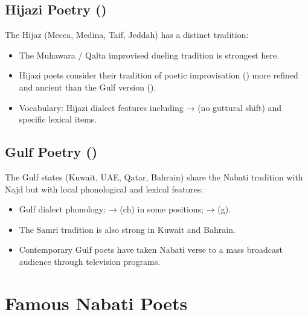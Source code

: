 \subsection{Hijazi Poetry ()}

The Hijaz (Mecca, Medina, Taif, Jeddah) has a distinct tradition:
\begin{itemize}
  \item The Muhawara / Qalta improvised dueling tradition is strongest here.
  \item Hijazi poets consider their tradition of poetic improvisation () more refined and ancient than the Gulf version ().
  \item Vocabulary: Hijazi dialect features including  →  (no guttural shift) and specific lexical items.
\end{itemize}

\subsection{Gulf Poetry ()}

The Gulf states (Kuwait, UAE, Qatar, Bahrain) share the Nabati tradition with Najd but with local phonological and lexical features:
\begin{itemize}
  \item Gulf dialect phonology:  →  (ch) in some positions;  →  (g).
  \item The Samri tradition is also strong in Kuwait and Bahrain.
  \item Contemporary Gulf poets have taken Nabati verse to a mass broadcast audience through television programs.
\end{itemize}

\section{Famous Nabati Poets}
\label{sec:nabati_poets}

